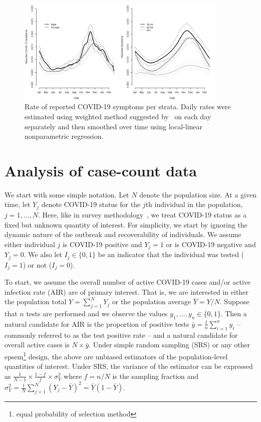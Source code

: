\documentclass[11pt]{amsart}
\numberwithin{equation}{section}
\theoremstyle{plain}
\begin{document}
 \begin{figure}[!th]
 \centering
 \includegraphics[width = 0.9\textwidth]{../figs/fbcovid19symptoms.png}
 \caption{Rate of reported COVID-19 symptoms per strata.  Daily rates were estimated using weighted method suggested by~\citep{doi:10.1073/pnas.2111454118} on each day separately and then smoothed over time using local-linear nonparametric regression.}
 \label{fig:fbsymptoms}
 \vspace{-0.3cm}
 \end{figure}


 \section{Analysis of case-count data}
 \label{section:casecount}

 We start with some simple notation.  Let $N$ denote the population size.  At a given time, let $Y_j$ denote COVID-19 status for the $j$th individual in the population, $j=1,\ldots, N$. Here, like in survey methodology~\citep{Cochran77}, we treat COVID-19 status as a fixed but unknown quantity of interest. For simplicity, we start by ignoring the dynamic nature of the outbreak and recoverability of individuals. We assume either individual $j$ is COVID-19 positive and $Y_j=1$ or is COVID-19 negative and $Y_j=0$. We also let $I_j \in \{0,1\}$ be an indicator that the individual was tested ($I_j = 1$) or not ($I_j=0$).

 To start, we assume the overall number of active COVID-19 cases and/or active infection rate (AIR) are of primary interest. That is, we are interested in either the population total $Y = \sum_{j=1}^N Y_j$ or the population average $\bar Y = Y/N$. Suppose that $n$ tests are performed and we observe the values $y_1, \ldots, y_n \in \{0,1\}$.  Then a natural candidate for AIR is the proportion of positive tests $\bar y = \frac{1}{n} \sum_{i=1}^n y_i$ -- commonly referred to as the test positive rate -- and a natural candidate for overall active cases is $N \times \bar y$.
 Under simple random sampling (SRS) or any other epsem\footnote{equal probability of selection method} design, the above are unbiased estimators of the population-level quantities of interest.  Under SRS, the variance of the estimator can be expressed as $\frac{1}{N-1} \times \frac{1-f}{f} \times \sigma_Y^2$ where $f = n/N$ is the sampling fraction and $\sigma_Y^2 = \frac{1}{N} \sum_{j=1}^N (Y_j - \bar Y)^2 = \bar Y (1- \bar Y)$.
\end{document}
